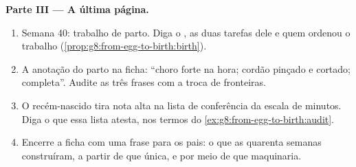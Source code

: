 \begin{problem}
\medskip\noindent\textbf{Parte III --- A última página.}
\begin{enumerate}[resume]
  \item Semana 40: trabalho de parto. Diga o , as duas tarefas
        dele e quem ordenou o trabalho
        (\cref{prop:g8:from-egg-to-birth:birth}).
  \item A anotação do parto na ficha: ``choro forte na hora; cordão
        pinçado e cortado;  completa''. Audite as três frases
        com a troca de fronteiras.
  \item O recém-nascido tira nota alta na lista de conferência da
        escala de minutos. Diga o que essa lista atesta, nos termos do
        \cref{ex:g8:from-egg-to-birth:audit}.
  \item Encerre a ficha com uma frase para os pais: o que as quarenta
        semanas construíram, a partir de que  única, e por meio
        de que maquinaria.
\end{enumerate}
\end{problem}
